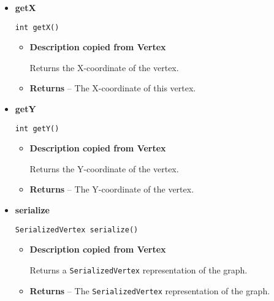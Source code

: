 {{{{{{{{{{{{{{{{\begin{itemize}
{\begin{itemize}
{Returns the name of the vertex. A descriptive name of the vertex. Multiple vertices with equal name in one graph are allowed. Therefore don't use this as identifier, instead use \texttt{\small getID()}.
}
\item{{\bf  Returns} -- 
The name of the vertex. 
}%
\end{itemize}
}%
\item{ 
{\bf  getX}\\
\begin{lstlisting}[frame=none]
int getX()\end{lstlisting} %
\begin{itemize}
\item{
{\bf  Description copied from Vertex{\small {}} }

Returns the X-coordinate of the vertex.
}
\item{{\bf  Returns} -- 
The X-coordinate of this vertex. 
}%
\end{itemize}
}%
\item{ 
{\bf  getY}\\
\begin{lstlisting}[frame=none]
int getY()\end{lstlisting} %
\begin{itemize}
\item{
{\bf  Description copied from Vertex{\small {}} }

Returns the Y-coordinate of the vertex.
}
\item{{\bf  Returns} -- 
The Y-coordinate of the vertex. 
}%
\end{itemize}
}%
\item{ 
{\bf  serialize}\\
\begin{lstlisting}[frame=none]
SerializedVertex serialize()\end{lstlisting} %
\begin{itemize}
\item{
{\bf  Description copied from Vertex{\small {}} }

Returns a \texttt{\small SerializedVertex}{\small 
{}} representation of the graph.
}
\item{{\bf  Returns} -- 
The \texttt{\small SerializedVertex}{\small 
{}} representation of the graph. 
}%
\end{itemize}
}%
\end{itemize}
}
}
}}}}}}}}}}}}}}
